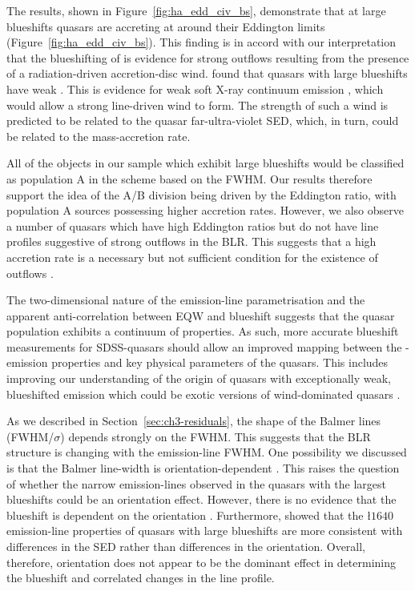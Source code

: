 The results, shown in Figure~\ref{fig:ha_edd_civ_bs}, demonstrate that at large blueshifts quasars are accreting at around their Eddington limits (Figure~\ref{fig:ha_edd_civ_bs}). 
This finding is in accord with our interpretation that the blueshifting of  is evidence for strong outflows resulting from the presence of a radiation-driven accretion-disc wind. 
\citet{richards02} found that quasars with large  blueshifts have weak .
This is evidence for weak soft X-ray continuum emission \citep{leighly04}, which would allow a strong line-driven wind to form.  
The strength of such a wind is predicted to be related to the quasar far-ultra-violet SED, which, in turn, could be related to the mass-accretion rate.

All of the objects in our sample which exhibit large  blueshifts would be classified as population A in the \citet{sulentic00b} scheme based on the \ha FWHM. 
Our results therefore support the idea of the \citet{sulentic00b} A/B division being driven by the Eddington ratio, with population A sources possessing higher accretion rates.
However, we also observe a number of quasars which have high Eddington ratios but do not have line profiles suggestive of strong outflows in the  BLR.  
This suggests that a high accretion rate is a necessary but not sufficient condition for the existence of outflows \citep{baskin05}. 

The two-dimensional nature of the  emission-line parametrisation and the apparent anti-correlation between  EQW and  blueshift suggests that the quasar population exhibits a continuum of properties. 
As such, more accurate  blueshift measurements for SDSS-quasars should allow an improved mapping between the -emission properties and key physical parameters of the quasars.
This includes improving our understanding of the origin of quasars with exceptionally weak, blueshifted  emission \citep[weak emission-line quasars;][]{luo15} which could be exotic versions of wind-dominated quasars \citep{plotkin15}.

As we described in Section~\ref{sec:ch3-residuals}, the shape of the Balmer lines (FWHM/$\sigma$) depends strongly on the FWHM. 
This suggests that the BLR structure is changing with the emission-line FWHM. 
One possibility we discussed is that the Balmer line-width is orientation-dependent \citep[e.g.][]{shen14}. 
This raises the question of whether the narrow \ha emission-lines observed in the quasars with the largest  blueshifts could be an orientation effect. 
However, there is no evidence that the  blueshift is dependent on the orientation \citep[inferred from the radio core-dominance;][]{richards11,runnoe14}. 
Furthermore, \citet{leighly04} showed that the \l$1640$ emission-line properties of quasars with large  blueshifts are more consistent with differences in the SED rather than differences in the orientation.
Overall, therefore, orientation does not appear to be the dominant effect in determining the  blueshift and correlated changes in the \ha line profile.

